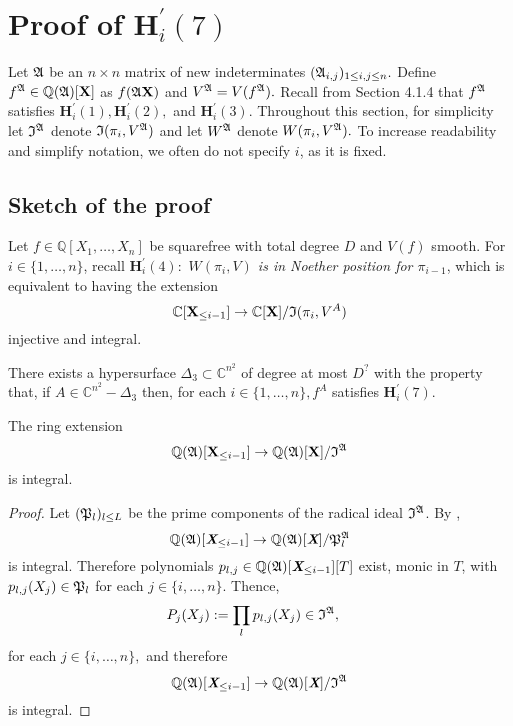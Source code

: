 \documentclass[sigconf]{acmart}
\def\Xb{\textit{\textbf{X}}}
\def\C{\mathbb{C}}
\def\I{\frak{I}}
\def\A{\frak{A}}
\def\fp{\frak{P}}
\begin{document}
\section{Proof of $\textbf{H}_i^{'}(7)$}
%
Let $\A$ be an $n \times n$ matrix of new indeterminates $(\A_{i,j})_{1 \leq i , j \leq n}.$ Define $f^{\A} \in \mathbb{Q}(\A)[\textbf{X}]$ as $f(\A\textbf{X})$ and $V^\A=V(f^\A).$ Recall from Section 4.1.4 that $f^\A$ satisfies $\textbf{H}_i^{'}(1),\textbf{H}_i^{'}(2),$ and $\textbf{H}_i^{'}(3).$ Throughout this section, for simplicity let $\I^\A$ denote $\I(\pi_i,V^\A)$ and let $W^\A$ denote $W(\pi_i,V^\A).$ To increase readability and simplify notation, we often do not specify $i$, as it is fixed.   
\subsection{Sketch of the proof}
Let $f \in \mathbb{Q}[X_1,\hdots,X_n]$ be squarefree with total degree $D$ and $V(f)$ smooth. For $i \in \{1,\hdots,n\}$, recall $\textbf{H}_i^{'}(4):$ \textit{$W(\pi_i,V)$ is in Noether position for $\pi_{i-1}$}, which is equivalent to having the extension  
\[
\C[\textbf{X}_{\leq i-1}]\rightarrow\C[\textbf{X}]/\frak{I}(\pi_i,V^A)
\]
injective and  integral.
%
\begin{theorem}
There exists a hypersurface $\Delta_3 \subset \C^{n^2}$ of degree at most $D^{?}$ with the property that, if $A \in \C^{n^2} - \Delta_3$ then, for each $i \in\{1,\hdots,n\}, f^A$ satisfies $\textbf{H}_i^{'}(7)$.
\end{theorem}
%
\begin{proposition} 
The ring extension \[\mathbb{Q}(\frak{A})[\textbf{X}_{\leq i-1}]\rightarrow\mathbb{Q}(\frak{A})[\textbf{X}]/\I^{\A}\] is integral.
\end{proposition}
%
\begin{proof}
Let $(\frak{P}_l)_{l \leq L}$ be the prime components of the radical ideal $\I^\A$. By \cite[Proposition 1]{EMP}, 
\[
\mathbb{Q}(\frak{A})[\textit{\textbf{X}}_{\leq i-1}]\rightarrow\mathbb{Q}(\frak{A})[\textit{\textbf{X}}]/\fp_l^{\A}
\] 
is integral. Therefore polynomials $p_{l,j}\in\mathbb{Q}(\frak{A})[\Xb_{\leq i-1}][T]$ exist, monic in $T$, with $p_{l,j}(X_j)\in \frak{P}_l$ for each $j\in \{i,\hdots,n\}.$ Thence, 
%
\begin{align*}
&P_{j}(X_j) := \prod_l p_{l,j}(X_j)\in\I^\A, 
\end{align*}
%
for each $j \in \{i,\hdots,n\},$ and therefore 
\[
\mathbb{Q}(\frak{A})[\textit{\textbf{X}}_{\leq i-1}]\rightarrow\mathbb{Q}(\frak{A})[\textit{\textbf{X}}]/\I^{\A}
\] 
is integral.
\end{proof}
\end{document}
